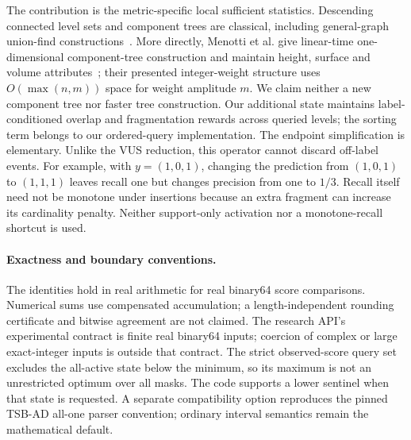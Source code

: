 The contribution is the metric-specific local sufficient statistics.
Descending connected level sets and component trees are classical, including
general-graph union-find constructions~\cite{najman2006}. More directly,
Menotti et al. give linear-time one-dimensional component-tree construction
and maintain height, surface and volume attributes~\cite{menotti2007}; their presented integer-weight structure uses
$O(\max(n,m))$ space for weight amplitude $m$. We claim neither a new
component tree nor faster tree construction. Our additional state maintains
label-conditioned overlap and fragmentation rewards across queried levels;
the sorting term belongs to our ordered-query implementation. The endpoint
simplification is elementary. Unlike the VUS reduction, this operator
cannot discard off-label events. For example, with $y=(1,0,1)$, changing the
prediction from $(1,0,1)$ to $(1,1,1)$ leaves recall one but changes precision
from one to $1/3$. Recall itself need not be monotone under insertions because
an extra fragment can increase its cardinality penalty. Neither support-only
activation nor a monotone-recall shortcut is used.

\paragraph{Exactness and boundary conventions.}
The identities hold in real arithmetic for real binary64 score comparisons.
Numerical sums use compensated accumulation; a length-independent rounding
certificate and bitwise agreement are not claimed. The research API's
experimental contract is finite real binary64 inputs; coercion of complex or
large exact-integer inputs is outside that contract. The strict observed-score
query set excludes the all-active state below the minimum, so its maximum is
not an unrestricted optimum over all masks. The code supports a lower sentinel
when that state is requested. A separate compatibility option reproduces the
pinned TSB-AD all-one parser convention; ordinary interval semantics remain the
mathematical default.

